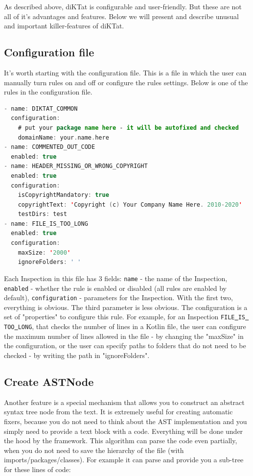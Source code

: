 \par As described above, diKTat is configurable and user-friendly. But these are not all of it's advantages and features. Below we will present and describe unusual and important killer-features of diKTat.

\subsection{Configuration file}
\par
It's worth starting with the configuration file. This is a file in which the user can manually turn rules on and off or configure the rules settings. Below is one of the rules in the configuration file.
\\
\begin{lstlisting}[caption={Part of configuration file.},
label={lst:example1}, language=Kotlin]
- name: DIKTAT_COMMON
  configuration:
    # put your package name here - it will be autofixed and checked
    domainName: your.name.here
- name: COMMENTED_OUT_CODE
  enabled: true
- name: HEADER_MISSING_OR_WRONG_COPYRIGHT
  enabled: true
  configuration:
    isCopyrightMandatory: true
    copyrightText: 'Copyright (c) Your Company Name Here. 2010-2020'
    testDirs: test
- name: FILE_IS_TOO_LONG
  enabled: true
  configuration:
    maxSize: '2000'
    ignoreFolders: ' '
\end{lstlisting}
Each Inspection in this file has 3 fields: \texttt{name} - the name of the Inspection, \texttt{enabled} - whether the rule is enabled or disabled (all rules are enabled by default), \texttt{configuration} - parameters for the Inspection. With the first two, everything is obvious. The third parameter is less obvious. The configuration is a set of "properties" to configure this rule. For example, for an Inspection \texttt{FILE\underline{ }IS\underline{ }TOO\underline{ }LONG}, that checks the number of lines in a Kotlin file, the user can configure the maximum number of lines allowed in the file - by changing the "maxSize" in the configuration, or the user can specify paths to folders that do not need to be checked - by writing the path in "ignoreFolders". \\

\subsection{Create ASTNode}
Another feature is a special mechanism that allows you to construct an abstract syntax tree node from the text. It is extremely useful for creating automatic fixers, because you do not need to think about the AST implementation and you simply need to provide a text block with a code. Everything will be done under the hood by the framework. This algorithm can parse the code even partially, when you do not need to save the hierarchy of the file (with imports/packages/classes).
For example it can parse and provide you a sub-tree for these lines of code:


